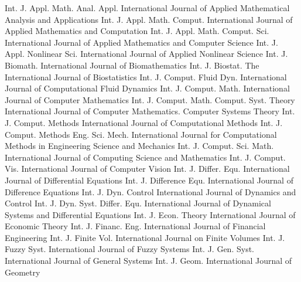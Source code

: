 {Int. J. Appl. Math. Anal. Appl.}
{International Journal of Applied Mathematical Analysis and Applications}
{Int. J. Appl. Math. Comput.}
{International Journal of Applied Mathematics and Computation}
{Int. J. Appl. Math. Comput. Sci.}
{International Journal of Applied Mathematics and Computer Science}
{Int. J. Appl. Nonlinear Sci.}
{International Journal of Applied Nonlinear Science}
{Int. J. Biomath.}
{International Journal of Biomathematics}
{Int. J. Biostat.}
{The International Journal of Biostatistics}
{Int. J. Comput. Fluid Dyn.}
{International Journal of Computational Fluid Dynamics}
{Int. J. Comput. Math.}
{International Journal of Computer Mathematics}
{Int. J. Comput. Math. Comput. Syst. Theory}
{International Journal of Computer Mathematics. Computer Systems Theory}
{Int. J. Comput. Methods}
{International Journal of Computational Methods}
{Int. J. Comput. Methods Eng. Sci. Mech.}
{International Journal for Computational Methods in Engineering Science and Mechanics}
{Int. J. Comput. Sci. Math.}
{International Journal of Computing Science and Mathematics}
{Int. J. Comput. Vis.}
{International Journal of Computer Vision}
{Int. J. Differ. Equ.}
{International Journal of Differential Equations}
{Int. J. Difference Equ.}
{International Journal of Difference Equations}
{Int. J. Dyn. Control}
{International Journal of Dynamics and Control}
{Int. J. Dyn. Syst. Differ. Equ.}
{International Journal of Dynamical Systems and Differential Equations}
{Int. J. Econ. Theory}
{International Journal of Economic Theory}
{Int. J. Financ. Eng.}
{International Journal of Financial Engineering}
{Int. J. Finite Vol.}
{International Journal on Finite Volumes}
{Int. J. Fuzzy Syst.}
{International Journal of Fuzzy Systems}
{Int. J. Gen. Syst.}
{International Journal of General Systems}
{Int. J. Geom.}
{International Journal of Geometry}
